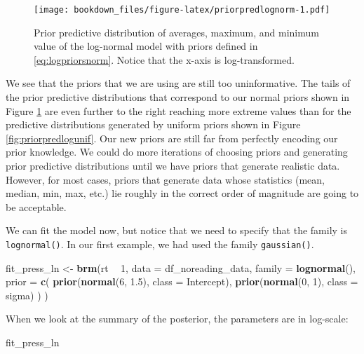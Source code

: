 \documentclass[12pt,]{krantz}
\newenvironment{Shaded}{\begin{snugshade}}{\end{snugshade}}
\newcommand{\KeywordTok}[1]{\textcolor[rgb]{0.13,0.29,0.53}{\textbf{#1}}}
\newcommand{\DataTypeTok}[1]{\textcolor[rgb]{0.13,0.29,0.53}{#1}}
\newcommand{\DecValTok}[1]{\textcolor[rgb]{0.00,0.00,0.81}{#1}}
\newcommand{\FloatTok}[1]{\textcolor[rgb]{0.00,0.00,0.81}{#1}}
\newcommand{\StringTok}[1]{\textcolor[rgb]{0.31,0.60,0.02}{#1}}
\newcommand{\OperatorTok}[1]{\textcolor[rgb]{0.81,0.36,0.00}{\textbf{#1}}}
\newcommand{\NormalTok}[1]{#1}
\theoremstyle{definition}
\theoremstyle{definition}
\theoremstyle{definition}
\theoremstyle{remark}
\begin{document}
\begin{figure}
\centering
\texttt{[image: bookdown\_files/figure-latex/priorpredlognorm-1.pdf]}
\caption{\label{fig:priorpredlognorm}Prior predictive distribution of averages,
maximum, and minimum value of the log-normal model with priors defined
in \eqref{eq:logpriorsnorm}. Notice that the x-axis is log-transformed.}
\end{figure}

We see that the priors that we are using are still too uninformative.
The tails of the prior predictive distributions that correspond to our
normal priors shown in Figure \ref{fig:priorpredlognorm} are even
further to the right reaching more extreme values than for the
predictive distributions generated by uniform priors shown in Figure
\ref{fig:priorpredlogunif}. Our new priors are still far from perfectly
encoding our prior knowledge. We could do more iterations of choosing
priors and generating prior predictive distributions until we have
priors that generate realistic data. However, for most cases, priors
that generate data whose statistics (mean, median, min, max, etc.) lie
roughly in the correct order of magnitude are going to be acceptable.

We can fit the model now, but notice that we need to specify that the
family is \texttt{lognormal()}. In our first example, we had used the
family \texttt{gaussian()}.

\begin{Shaded}
\begin{Highlighting}[]
\NormalTok{fit_press_ln <-}\StringTok{ }\KeywordTok{brm}\NormalTok{(rt }\OperatorTok{~}\StringTok{ }\DecValTok{1}\NormalTok{,}
  \DataTypeTok{data =}\NormalTok{ df_noreading_data,}
  \DataTypeTok{family =} \KeywordTok{lognormal}\NormalTok{(),}
  \DataTypeTok{prior =} \KeywordTok{c}\NormalTok{(}
    \KeywordTok{prior}\NormalTok{(}\KeywordTok{normal}\NormalTok{(}\DecValTok{6}\NormalTok{, }\FloatTok{1.5}\NormalTok{), }\DataTypeTok{class =}\NormalTok{ Intercept),}
    \KeywordTok{prior}\NormalTok{(}\KeywordTok{normal}\NormalTok{(}\DecValTok{0}\NormalTok{, }\DecValTok{1}\NormalTok{), }\DataTypeTok{class =}\NormalTok{ sigma)}
\NormalTok{  )}
\NormalTok{)}
\end{Highlighting}
\end{Shaded}

When we look at the summary of the posterior, the parameters are in
log-scale:

\begin{Shaded}
\begin{Highlighting}[]
\NormalTok{fit_press_ln}
\end{Highlighting}
\end{Shaded}
\end{document}
